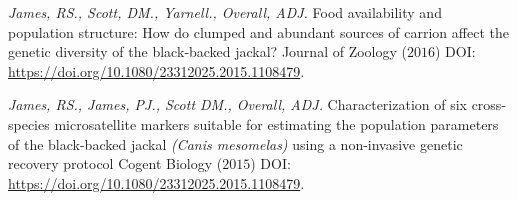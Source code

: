 \documentclass[hidelinks]{james-cv} %
\begin{document}
\begin{reflist}
\ent
\textit{James, RS., Scott, DM., Yarnell., Overall, ADJ. } {Food availability and population structure: How do clumped and abundant sources of carrion affect the genetic diversity of the black‐backed jackal? } {Journal of Zoology \color{gray}($2016$) \bodyfontsc DOI: \thinfont\color{blue}\href{https://www.tandfonline.com/doi/full/10.1080/23312025.2015.1108479}{https://doi.org/10.1080/23312025.2015.1108479}.}

\ent
\textit{James, RS., James, PJ., Scott DM., Overall, ADJ. } {Characterization of six cross-species microsatellite markers suitable for estimating the population parameters of the black-backed jackal \textit{(Canis mesomelas)} \textrm using a non-invasive genetic recovery protocol } {Cogent Biology \color{gray}($2015$) \bodyfontsc DOI: \thinfont\color{blue}\href{https://www.tandfonline.com/doi/full/10.1080/23312025.2015.1108479}{https://doi.org/10.1080/23312025.2015.1108479}.}

\ent
\textit\footnotesize{}
\end{reflist}
\end{document}
